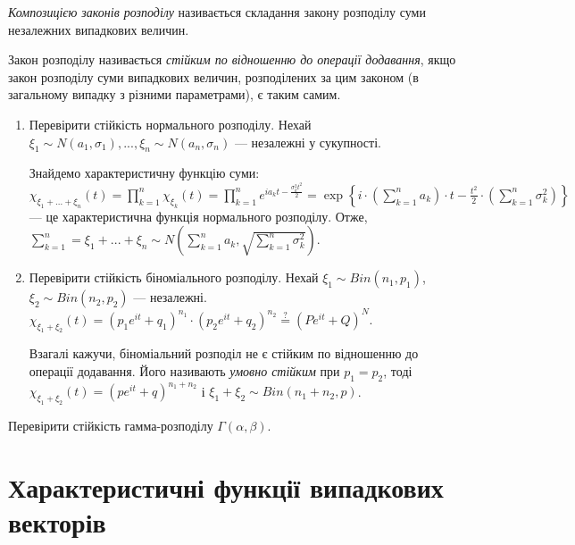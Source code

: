 \begin{definition}
    \emph{Композицією законів розподілу} називається складання закону розподілу суми незалежних випадкових величин.
    
    Закон розподілу називається \emph{стійким по відношенню до операції додавання},
    якщо закон розподілу суми випадкових величин, розподілених за цим законом (в загальному випадку з різними параметрами),
    є таким самим.
\end{definition}
\begin{example}
    \begin{enumerate}
        \item Перевірити стійкість нормального розподілу. Нехай $\xi_1 \sim {N}(a_1, \sigma_1), ..., \xi_n \sim {N}(a_n, \sigma_n)$ ---
        незалежні у сукупності. 
    
        Знайдемо характеристичну функцію суми: $\chi_{\xi_1 + ... + \xi_n}(t) = \prod\limits_{k=1}^n \chi_{\xi_k}(t)=
        \prod\limits_{k=1}^n e^{ia_k t - \frac{\sigma_k^2 t^2}{2}} = 
        \exp\left\{i\cdot \left( \sum\limits_{k=1}^n a_k\right)\cdot t - \frac{t^2}{2}\cdot\left( \sum\limits_{k=1}^n \sigma_k^2\right)\right\}$ ---
        це характеристична функція нормального розподілу. Отже, $\sum\limits_{k=1}^n = \xi_1 + ... + \xi_n \sim {N}\left(\sum\limits_{k=1}^n a_k,  \sqrt{\sum\limits_{k=1}^n \sigma_k^2}\right)$.
        \item Перевірити стійкість біноміального розподілу. Нехай $\xi_1 \sim {Bin}(n_1, p_1)$, $\xi_2 \sim {Bin}(n_2, p_2)$ --- незалежні.
        $\chi_{\xi_1 + \xi_2} (t) = \left( p_1 e^{it} + q_1\right)^{n_1} \cdot \left( p_2 e^{it} + q_2\right)^{n_2} \overset{?}{=} \left(P e^{it} + Q\right)^N$.

        Взагалі кажучи, біноміальний розподіл не є стійким по відношенню до  операції додавання.
        Його називають \emph{умовно стійким} при $p_1 = p_2$, тоді
        $\chi_{\xi_1 + \xi_2} (t) = \left( p e^{it} + q\right)^{n_1 + n_2}$ і $\xi_1 + \xi_2 \sim {Bin}(n_1+n_2, p)$.
    \end{enumerate}
\end{example}

\begin{exercise}
    Перевірити стійкість гамма-розподілу $\Gamma(\alpha, \beta)$.
\end{exercise}

\section{Характеристичні функції випадкових векторів}
